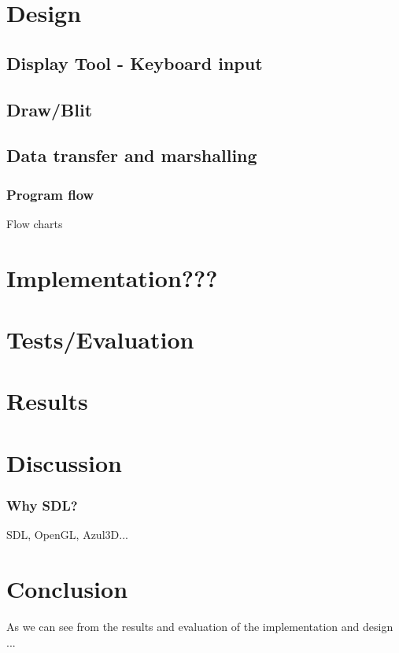 \documentclass[12pt, a4paper, oneside]{article}
\begin{document}
\section{Design}
\subsection{Display Tool - Keyboard input}
\subsection{Draw/Blit}
\subsection{Data transfer and marshalling}
\subsubsection{Program flow}
Flow charts
\section{Implementation???}
\section{Tests/Evaluation}
\section{Results}
\section{Discussion}
\subsubsection{Why SDL?}
SDL, OpenGL, Azul3D...
\section{Conclusion}
As we can see from the results and evaluation of the implementation and design ...


\newpage




\end{document}
